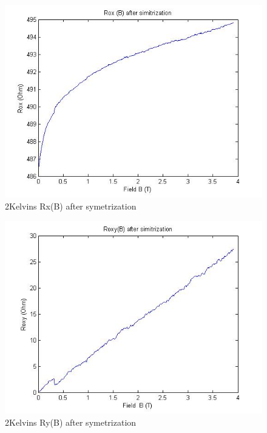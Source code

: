 \documentclass[idxtotoc,hyperref,openany,oneside]{labbook} %
\begin{document}
\begin{figure}[H] %
\begin{center}
\includegraphics[width=1\linewidth]{7462kRox.jpg}
\end{center}
\caption{2Kelvins Rx(B)  after symetrization} 
\label{fig:fig4}
\end{figure}


\begin{figure}[H] %
\begin{center}
\includegraphics[width=1\linewidth]{7462kRoy.jpg}
\end{center}
\caption{2Kelvins Ry(B)  after symetrization} 
\label{fig:fig5}
\end{figure}
\end{document}
